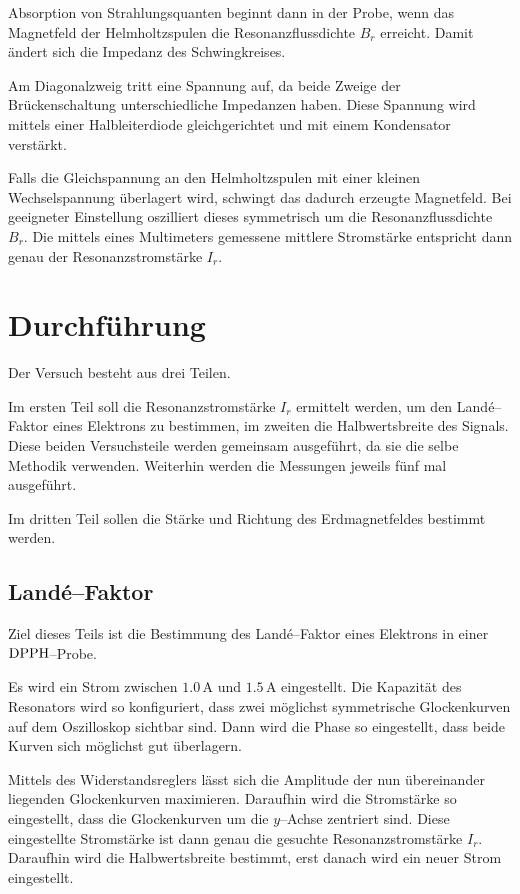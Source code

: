 \documentclass[12pt,a4paper]{scrartcl}
\numberwithin{equation}{section} %
\begin{document}
Absorption von Strahlungsquanten beginnt dann in der Probe, wenn das Magnetfeld der Helmholtzspulen die Resonanzflussdichte $B_r$ erreicht. Damit ändert sich die Impedanz des Schwingkreises.

Am Diagonalzweig tritt eine Spannung auf, da beide Zweige der Brückenschaltung unterschiedliche Impedanzen haben. Diese Spannung wird mittels einer Halbleiterdiode gleichgerichtet und mit einem Kondensator verstärkt.

Falls die Gleichspannung an den Helmholtzspulen mit einer kleinen Wechselspannung überlagert wird, schwingt das dadurch erzeugte Magnetfeld. Bei geeigneter Einstellung oszilliert dieses symmetrisch um die Resonanzflussdichte $B_r$. Die mittels eines Multimeters gemessene mittlere Stromstärke entspricht dann genau der Resonanzstromstärke $I_r$.

\clearpage
\hypertarget{durchfuxfchrung}{\section{Durchführung}\label{durchfuxfchrung}}
Der Versuch besteht aus drei Teilen.

Im ersten Teil soll die Resonanzstromstärke $I_r$ ermittelt werden, um den Landé--Faktor eines Elektrons zu bestimmen, im zweiten die Halbwertsbreite des Signals. Diese beiden Versuchsteile werden gemeinsam ausgeführt, da sie die selbe Methodik verwenden. Weiterhin werden die Messungen jeweils fünf mal ausgeführt.

Im dritten Teil sollen die Stärke und Richtung des Erdmagnetfeldes bestimmt werden.

\subsection{Landé--Faktor}
\label{durchfuxfchrung:Lande-Faktor}
Ziel dieses Teils ist die Bestimmung des Landé--Faktor eines Elektrons in einer $\ce{DPPH}$--Probe.

Es wird ein Strom zwischen $1.0\mathrm{\, A}$ und $1.5 \mathrm{\, A}$ eingestellt. Die Kapazität des Resonators wird so konfiguriert, dass zwei möglichst symmetrische Glockenkurven auf dem Oszilloskop sichtbar sind. Dann wird die Phase so eingestellt, dass beide Kurven sich möglichst gut überlagern.

Mittels des Widerstandsreglers lässt sich die Amplitude der nun übereinander liegenden Glockenkurven maximieren. Daraufhin wird die Stromstärke so eingestellt, dass die Glockenkurven um die $y$--Achse zentriert sind. Diese eingestellte Stromstärke ist dann genau die gesuchte Resonanzstromstärke $I_r$. Daraufhin wird die Halbwertsbreite bestimmt, erst danach wird ein neuer Strom eingestellt.
\end{document}
